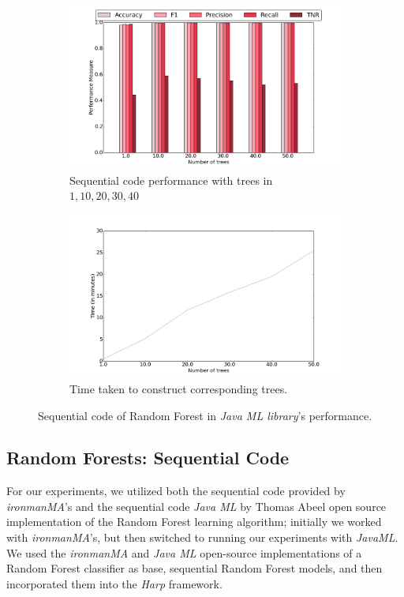 \documentclass{sig-alternate-05-2015}
\begin{document}
\begin{figure}[t]
\centering
\begin{subfigure}{.4\textwidth}
\centering
\includegraphics[scale=0.2]{figures/seqPerf.png}
\caption{Sequential code performance with trees in ${1,10,20,30,40}$}
\end{subfigure}
\begin{subfigure}{.4\textwidth}
\centering
\includegraphics[scale=0.2]{figures/seqTime.png}
\caption{Time taken to construct corresponding trees.}
\end{subfigure}
\caption{Sequential code of Random Forest in \textit{Java ML library}'s performance.}
\label{fig:seqCode}
\end{figure}

\subsection{Random Forests: Sequential Code}
For our experiments, we utilized both the sequential code provided by \textit{ironmanMA}'s \cite{seqCode} and the sequential code \textit{Java ML} by Thomas Abeel \cite{jmlSeqCode} open source implementation of the Random Forest learning algorithm; initially we worked with \textit{ironmanMA}'s, but then switched to running our experiments with \textit{JavaML}.  We used the \textit{ironmanMA} and \textit{Java ML} open-source implementations of a Random Forest classifier as base, sequential Random Forest models, and then incorporated them into the \textit{Harp} framework.  
\end{document}
